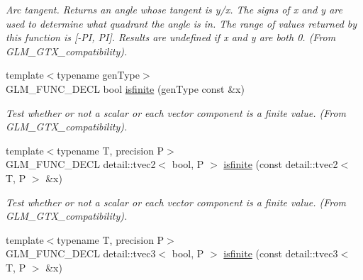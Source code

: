 \begin{CompactItemize}
\begin{CompactList}\small\item\em Arc tangent. Returns an angle whose tangent is y/x. The signs of x and y are used to determine what quadrant the angle is in. The range of values returned by this function is \mbox{[}-PI, PI\mbox{]}. Results are undefined if x and y are both 0. (From GLM\_\-GTX\_\-compatibility). \item\end{CompactList}\item 
\hypertarget{group__gtx__compatibility_g0f43f5c5f8a44847a752d956124b16c6}{
{\footnotesize template$<$typename genType$>$ }\\GLM\_\-FUNC\_\-DECL bool \hyperlink{group__gtx__compatibility_g0f43f5c5f8a44847a752d956124b16c6}{isfinite} (genType const \&x)}
\label{group__gtx__compatibility_g0f43f5c5f8a44847a752d956124b16c6}

\begin{CompactList}\small\item\em Test whether or not a scalar or each vector component is a finite value. (From GLM\_\-GTX\_\-compatibility). \item\end{CompactList}\item 
\hypertarget{group__gtx__compatibility_ga839174ff8da8801658c229b845445e7}{
{\footnotesize template$<$typename T, precision P$>$ }\\GLM\_\-FUNC\_\-DECL detail::tvec2$<$ bool, P $>$ \hyperlink{group__gtx__compatibility_ga839174ff8da8801658c229b845445e7}{isfinite} (const detail::tvec2$<$ T, P $>$ \&x)}
\label{group__gtx__compatibility_ga839174ff8da8801658c229b845445e7}

\begin{CompactList}\small\item\em Test whether or not a scalar or each vector component is a finite value. (From GLM\_\-GTX\_\-compatibility). \item\end{CompactList}\item 
\hypertarget{group__gtx__compatibility_gf5f4c2e344d29a7d71f6894384a702e7}{
{\footnotesize template$<$typename T, precision P$>$ }\\GLM\_\-FUNC\_\-DECL detail::tvec3$<$ bool, P $>$ \hyperlink{group__gtx__compatibility_gf5f4c2e344d29a7d71f6894384a702e7}{isfinite} (const detail::tvec3$<$ T, P $>$ \&x)}
\label{group__gtx__compatibility_gf5f4c2e344d29a7d71f6894384a702e7}


\end{CompactItemize}
